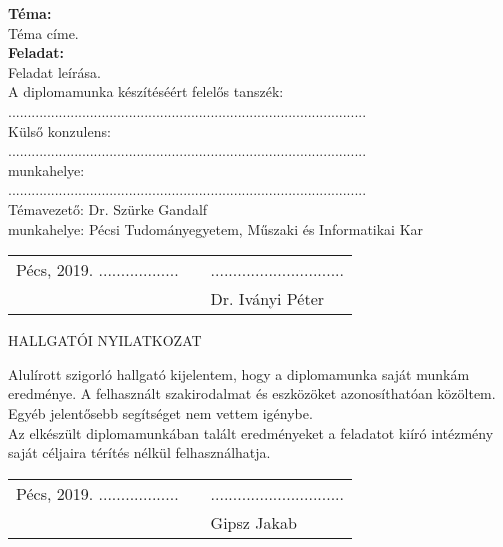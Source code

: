 \documentclass[oneside,a4paper,9pt]{article}
\begin{document}
	\noindent
	\textbf{Téma:}\\
	Téma címe.\\
	
	\noindent
	\textbf{Feladat:}\\
	Feladat leírása.\\
	
	\noindent
	A diplomamunka készítéséért felelős tanszék:\\
	............................................................................................\\
	
	\noindent
	Külső konzulens:\\ ............................................................................................
	\\munkahelye:\\ ............................................................................................\\
	
	\noindent
	Témavezető: Dr. Szürke Gandalf\\
	munkahelye: Pécsi Tudományegyetem, Műszaki és Informatikai Kar
	\\
	\bigskip
	\bigskip
	\begin{center}
		\begin{tabularx}{\textwidth}{
				>{\hsize=0.5\hsize}X
				>{\hsize=0.3\hsize}X
				>{\hsize=0.2\hsize}X}
			Pécs, 2019. .................. & & .............................. \\
			& & Dr. Iványi Péter
		\end{tabularx}
	\end{center}
	
	\pagebreak
	\thispagestyle{empty}
	
	\begin{center}
		\Large
		HALLGATÓI NYILATKOZAT\\
	\end{center}
	\vspace{30mm}
	\noindent \normalsize
	Alulírott szigorló hallgató kijelentem, hogy a diplomamunka saját munkám eredménye. A felhasznált szakirodalmat és eszközöket azonosíthatóan közöltem. Egyéb jelentősebb segítséget nem vettem igénybe.\\
	Az elkészült diplomamunkában talált eredményeket a feladatot kiíró intézmény saját céljaira térítés nélkül felhasználhatja.\\
	\vspace{30mm}
	\begin{center}
		\begin{tabularx}{\textwidth}{
				>{\hsize=0.5\hsize}X
				>{\hsize=0.3\hsize}X
				>{\hsize=0.2\hsize}X}
			Pécs, 2019. .................. & & .............................. \\
			& & Gipsz Jakab
		\end{tabularx}
	\end{center}
	
\end{document}
